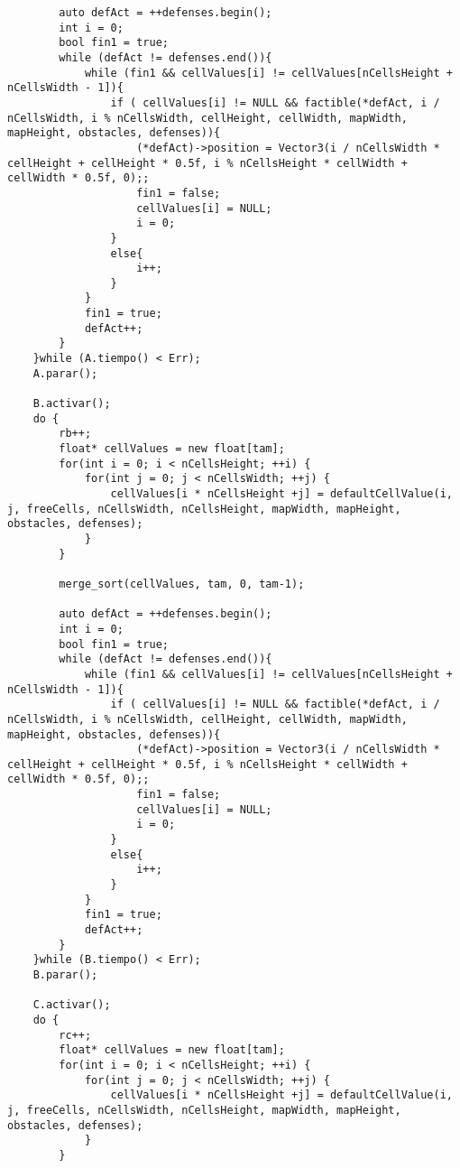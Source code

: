 \begin{lstlisting}
        auto defAct = ++defenses.begin();
        int i = 0;
        bool fin1 = true;
        while (defAct != defenses.end()){
            while (fin1 && cellValues[i] != cellValues[nCellsHeight + nCellsWidth - 1]){
                if ( cellValues[i] != NULL && factible(*defAct, i / nCellsWidth, i % nCellsWidth, cellHeight, cellWidth, mapWidth, mapHeight, obstacles, defenses)){
                    (*defAct)->position = Vector3(i / nCellsWidth * cellHeight + cellHeight * 0.5f, i % nCellsHeight * cellWidth + cellWidth * 0.5f, 0);;
                    fin1 = false;
                    cellValues[i] = NULL;
                    i = 0;
                }
                else{
                    i++;
                }
            }
            fin1 = true;
            defAct++;
        }
    }while (A.tiempo() < Err);
    A.parar();

    B.activar();
    do {
        rb++;
        float* cellValues = new float[tam]; 
        for(int i = 0; i < nCellsHeight; ++i) {
            for(int j = 0; j < nCellsWidth; ++j) {
                cellValues[i * nCellsHeight +j] = defaultCellValue(i, j, freeCells, nCellsWidth, nCellsHeight, mapWidth, mapHeight, obstacles, defenses);
            }
        }

        merge_sort(cellValues, tam, 0, tam-1);

        auto defAct = ++defenses.begin();
        int i = 0;
        bool fin1 = true;
        while (defAct != defenses.end()){
            while (fin1 && cellValues[i] != cellValues[nCellsHeight + nCellsWidth - 1]){
                if ( cellValues[i] != NULL && factible(*defAct, i / nCellsWidth, i % nCellsWidth, cellHeight, cellWidth, mapWidth, mapHeight, obstacles, defenses)){
                    (*defAct)->position = Vector3(i / nCellsWidth * cellHeight + cellHeight * 0.5f, i % nCellsHeight * cellWidth + cellWidth * 0.5f, 0);;
                    fin1 = false;
                    cellValues[i] = NULL;
                    i = 0;
                }
                else{
                    i++;
                }
            }
            fin1 = true;
            defAct++;
        }
    }while (B.tiempo() < Err);
    B.parar();

    C.activar();
    do {
        rc++;
        float* cellValues = new float[tam]; 
        for(int i = 0; i < nCellsHeight; ++i) {
            for(int j = 0; j < nCellsWidth; ++j) {
                cellValues[i * nCellsHeight +j] = defaultCellValue(i, j, freeCells, nCellsWidth, nCellsHeight, mapWidth, mapHeight, obstacles, defenses);
            }
        }


\end{lstlisting}
